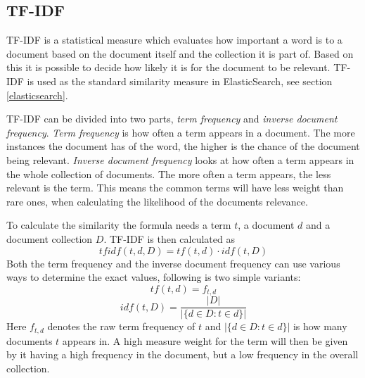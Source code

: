 \subsection{TF-IDF} \label{tf/idf}
TF-IDF is a statistical measure which evaluates how important a word is to a document based on the document itself and the collection it is part of. Based on this it is possible to decide how likely it is for the document to be relevant. TF-IDF is used as the standard similarity measure in ElasticSearch, see section \ref{elasticsearch}.

TF-IDF can be divided into two parts, \textit{term frequency} and \textit{inverse document frequency}. \textit{Term frequency} is how often a term appears in a document. The more instances the document has of the word, the higher is the chance of the document being relevant. \textit{Inverse document frequency} looks at how often a term appears in the whole collection of documents. The more often a term appears, the less relevant is the term. This means the common terms will have less weight than rare ones, when calculating the likelihood of the documents relevance.

To calculate the similarity the formula needs a term \(t\), a document \(d\) and a document collection \(D\). TF-IDF is then calculated as
\[tfidf(t, d, D) = tf(t, d)  \cdot idf(t, D)\]
Both the term frequency and the inverse document frequency can use various ways to determine the exact values, following is two simple variants: 
\[tf(t, d) = f_{t,d}\] 
\[idf(t, D) = \frac{|D|}{ |\{d \in D: t \in d\}| }\]
Here \(f_{t,d}\) denotes the raw term frequency of \(t\) and \( |\{d \in D: t \in d\}| \) is how many documents \(t\) appears in. A high measure weight for the term will then be given by it having a high frequency in the document, but a low frequency in the overall collection.



\cleardoublepage